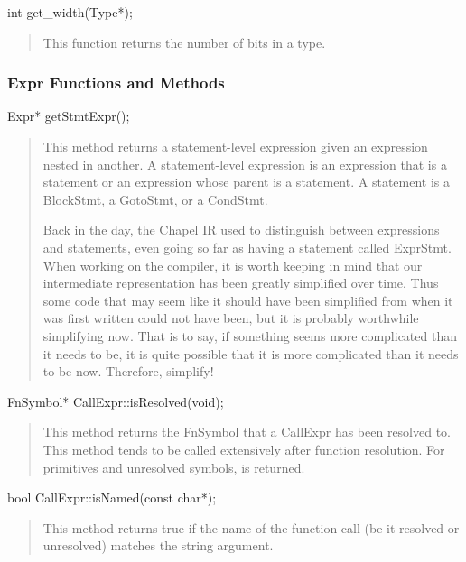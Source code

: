 \documentclass[10pt]{article}
\begin{document}
\begin{clang}
int get_width(Type*);
\end{clang}
\begin{quote}
This function returns the number of bits in a type.
\end{quote}

\subsubsection{Expr Functions and Methods}

\begin{clang}
Expr* getStmtExpr();
\end{clang}
\begin{quote}
This method returns a statement-level expression given an expression
nested in another.  A statement-level expression is an expression that
is a statement or an expression whose parent is a statement.  A
statement is a BlockStmt, a GotoStmt, or a CondStmt.

Back in the day,
the Chapel IR used to distinguish between expressions and statements,
even going so far as having a statement called ExprStmt.  When working
on the compiler, it is worth keeping in mind that our intermediate
representation has been greatly simplified over time.  Thus some code
that may seem like it should have been simplified from when it was
first written could not have been, but it is probably worthwhile
simplifying now.  That is to say, if something seems more complicated
than it needs to be, it is quite possible that it is more complicated
than it needs to be now.  Therefore, simplify!
\end{quote}

\begin{clang}
FnSymbol* CallExpr::isResolved(void);
\end{clang}
\begin{quote}
This method returns the FnSymbol that a CallExpr has been resolved to.
This method tends to be called extensively after function resolution.
For primitives and unresolved symbols,  is returned.
\end{quote}

\begin{clang}
bool CallExpr::isNamed(const char*);
\end{clang}
\begin{quote}
This method returns true if the name of the function call (be it
resolved or unresolved) matches the string argument.
\end{quote}
\end{document}
